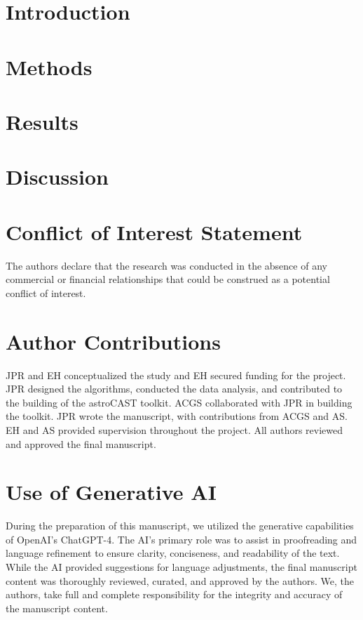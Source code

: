 \documentclass[utf8]{FrontiersinHarvard}
\begin{document}
    \section{Introduction}
    


    \section{Methods}
    


    \section{Results}
    

    
    
    
    


    \section{Discussion}
    

    \section*{Conflict of Interest Statement}
    The authors declare that the research was conducted in the absence of any commercial or financial relationships that could be construed as a potential conflict of interest.

    \section*{Author Contributions}
    JPR and EH conceptualized the study and EH secured funding for the project. JPR designed the algorithms, conducted the data analysis, and contributed to the building of the astroCAST toolkit. ACGS collaborated with JPR in building the toolkit. JPR wrote the manuscript, with contributions from ACGS and AS. EH and AS provided supervision throughout the project. All authors reviewed and approved the final manuscript.

    \section*{Use of Generative AI}
    During the preparation of this manuscript, we utilized the generative capabilities of OpenAI's ChatGPT-4. The AI's primary role was to assist in proofreading and language refinement to ensure clarity, conciseness, and readability of the text. While the AI provided suggestions for language adjustments, the final manuscript content was thoroughly reviewed, curated, and approved by the authors. We, the authors, take full and complete responsibility for the integrity and accuracy of the manuscript content.
\end{document}
